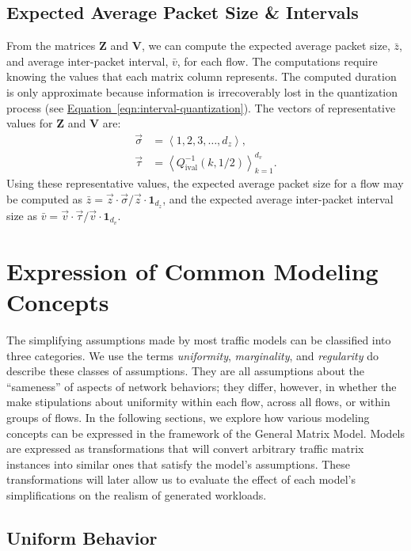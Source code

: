 \documentclass[twocolumn,final]{svjour3}
\newcommand{\Equation}[1]{\hyperref[eqn:#1]{Equation~\ref*{eqn:#1}}}
\newcommand{\Di}{Q^{-1}_{\text{ival}}}
\newcommand{\ones}[1]{\mathbf{1}_{#1}}
\newcommand{\mat}[1]{\mathbf{#1}}
\newcommand{\mean}[1]{\bar{#1}}
\newcommand{\seq}[1]{\left<#1\right>}
\newcommand{\fracx}[2]{#1/#2}
\begin{document}
\subsection{Expected Average Packet Size \& Intervals}
\label{sec:flow-totals}

From the matrices $\mat{Z}$ and $\mat{V}$, we can compute the expected average packet size, $\mean{z}$, and average inter-packet interval, $\mean{v}$, for each flow. The computations require knowing the values that each matrix column represents. The computed duration is only approximate because information is irrecoverably lost in the quantization process (see \Equation{interval-quantization}). The vectors of representative values for $\mat{Z}$ and $\mat{V}$ are:
\begin{align}
\vec{\sigma}&=\seq{1,2,3,\dots,d_z},\\
\vec{\tau}&=\seq{\Di\left(k,\fracx{1}{2}\right)}_{k=1}^{d_v}.
\end{align}
Using these representative values, the expected average packet size for a flow may be computed as $\mean{z}=\fracx{\vec{z}\cdot\vec{\sigma}}{\vec{z}\cdot\ones{d_z}}$, and the expected average inter-packet interval size as $\mean{v}=\fracx{\vec{v}\cdot\vec{\tau}}{\vec{v}\cdot\ones{d_v}}$.

\section{Expression of Common Modeling Concepts}
\label{sec:modeling-concepts}

The simplifying assumptions made by most traffic models can be classified into three categories. We use the terms \textit{uniformity}, \textit{marginality}, and \textit{regularity} do describe these classes of assumptions. They are all assumptions about the ``sameness'' of aspects of network behaviors; they differ, however, in whether the make stipulations about uniformity within each flow, across all flows, or within groups of flows. In the following sections, we explore how various modeling concepts can be expressed in the framework of the General Matrix Model. Models are expressed as transformations that will convert arbitrary traffic matrix instances into similar ones that satisfy the model's assumptions. These transformations will later allow us to evaluate the effect of each model's simplifications on the realism of generated workloads.

\subsection{Uniform Behavior}
\end{document}
